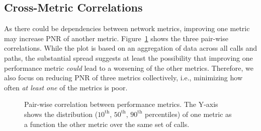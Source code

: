 \subsection{Cross-Metric Correlations}
\label{subsec:measurement:voip:correlation}

As there could be dependencies between network 
metrics, improving one metric may increase PNR of another 
metric. 
Figure~\ref{fig:perf-correlation} shows the three pair-wise 
correlations. 
While the plot is based on an aggregation of data across all 
calls and paths, the substantial spread suggests at least the 
possibility that improving one performance metric {\em could} 
lead to a worsening of the other metrics. 
Therefore, we also focus on reducing PNR of three metrics 
collectively, i.e., minimizing how often {\em at least one} of 
the metrics is poor.

\begin{figure}[t!]
\centering
{}
\caption{Pair-wise correlation between performance metrics. 
The Y-axis shows the distribution ($10^{\text{th}}$, $50^{\text{th}}$, 
$90^{\text{th}}$ percentiles) of one metric as a function the other 
metric over the same set of calls.}
\label{fig:perf-correlation}
\end{figure}




